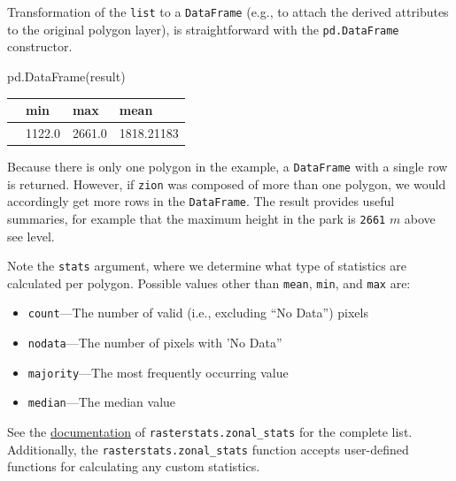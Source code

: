 \documentclass[
  letterpaper,
]{krantz}
\newenvironment{Shaded}{\begin{snugshade}}{\end{snugshade}}
\newcommand{\NormalTok}[1]{\textcolor[rgb]{0.00,0.23,0.31}{#1}}
\providecommand{\tightlist}{%
  \setlength{\itemsep}{0pt}\setlength{\parskip}{0pt}}\usepackage{longtable,booktabs,array}
\begin{document}
Transformation of the \texttt{list} to a \texttt{DataFrame} (e.g., to
attach the derived attributes to the original polygon layer), is
straightforward with the \texttt{pd.DataFrame} constructor.

\begin{Shaded}
\begin{Highlighting}[]
\NormalTok{pd.DataFrame(result)}
\end{Highlighting}
\end{Shaded}

\begin{longtable}[]{@{}llll@{}}
\toprule\noalign{}
& min & max & mean \\
\midrule\noalign{}
\endhead
\bottomrule\noalign{}
\endlastfoot
0 & 1122.0 & 2661.0 & 1818.21183 \\
\end{longtable}

Because there is only one polygon in the example, a \texttt{DataFrame}
with a single row is returned. However, if \texttt{zion} was composed of
more than one polygon, we would accordingly get more rows in the
\texttt{DataFrame}. The result provides useful summaries, for example
that the maximum height in the park is \texttt{2661} \(m\) above see
level.

Note the \texttt{stats} argument, where we determine what type of
statistics are calculated per polygon. Possible values other than
\texttt{\textquotesingle{}mean\textquotesingle{}},
\texttt{\textquotesingle{}min\textquotesingle{}}, and
\texttt{\textquotesingle{}max\textquotesingle{}} are:

\begin{itemize}
\tightlist
\item
  \texttt{\textquotesingle{}count\textquotesingle{}}---The number of
  valid (i.e., excluding ``No Data'') pixels
\item
  \texttt{\textquotesingle{}nodata\textquotesingle{}}---The number of
  pixels with 'No Data''
\item
  \texttt{\textquotesingle{}majority\textquotesingle{}}---The most
  frequently occurring value
\item
  \texttt{\textquotesingle{}median\textquotesingle{}}---The median value
\end{itemize}

See the
\href{https://pythonhosted.org/rasterstats/manual.html\#statistics}{documentation}
of \texttt{rasterstats.zonal\_stats} for the complete list.
Additionally, the \texttt{rasterstats.zonal\_stats} function accepts
user-defined functions for calculating any custom statistics.
\end{document}
